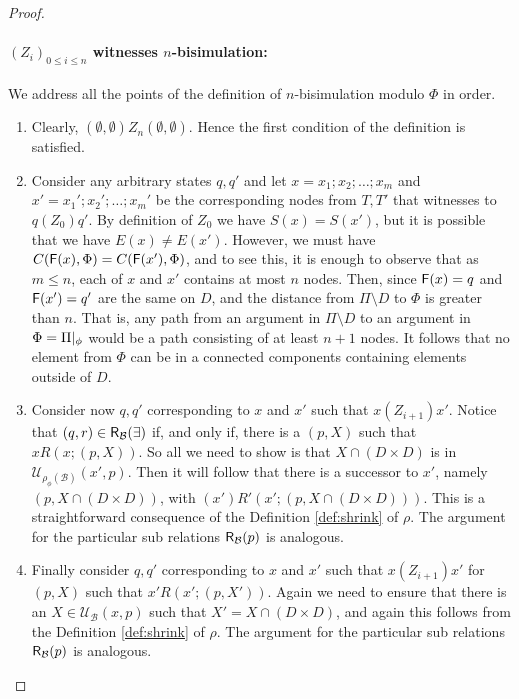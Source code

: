 \documentclass{llncs}
\newcommand{\rels}[1]{{\sf R_{#1}}}
\newcommand{\update}[3]{{\mathcal U}_{#1}(#2,#3)}
\newcommand{\af}{{\sf F}}
\newcommand{\views}{\mathcal B}
\begin{document}
\begin{proof}
\paragraph{$(Z_i)_{0 \leq i \leq n}$ witnesses $n$-bisimulation:} We address all the points of the definition of $n$-bisimulation modulo $\Phi$ in order.
\begin{enumerate}
\item Clearly, $(\emptyset, \emptyset) Z_n (\emptyset, \emptyset)$. Hence the first condition of the definition is satisfied. 
\item Consider any arbitrary states $q,q'$ and let $x = x_1;x_2;\dots;x_m$ and $x' = x_1';x_2';\dots;x_m'$ be the corresponding nodes from $T,T'$ that witnesses to $q(Z_0)q'$. By definition of $Z_0$ we have $S(x) = S(x')$, but it is possible that we have $E(x) \not = E(x')$. However, we must have $C(\af(x), \Phi) = C(\af(x'), \Phi)$, and to see this, it is enough to observe that as $m \leq n$, each of $x$ and $x'$ contains at most $n$ nodes. Then, since $\af(x) = q$ and $\af(x') = q'$ are the same on $D$, and the distance from $\Pi \setminus D$ to $\Phi$ is greater than $n$. That is, any path from an argument in $\Pi \setminus D$ to an argument in $\Phi = {\Pi}|_{\phi}$ would be a path consisting of at least $n+1$ nodes. It follows that no element from $\Phi$ can be in a connected components containing elements outside of $D$.
\item Consider now $q,q'$ corresponding to $x$ and $x'$ such that $x (Z_{i + 1}) x'$. Notice that $(q,r) \in \rels \views(\exists)$ if, and only if, there is a $(p, X)$ such that $x R (x;(p, X))$. So all we need to show is that $X \cap (D \times D)$ is in $\update {\rho_\phi(\views)} {x'} p$. Then it will follow that there is a successor to $x'$, namely $(p, X \cap (D \times D))$, with $(x')R'(x';(p, X \cap (D \times D)))$. This is a straightforward consequence of the Definition \ref{def:shrink} of $\rho$. The argument for the particular sub relations $\rels \views(p)$ is analogous. 
\item Finally consider $q,q'$ corresponding to $x$ and $x'$ such that $x (Z_{i + 1}) x'$ for $(p, X)$ such that $x' R (x';(p, X'))$. Again we need to ensure that there is an $X \in \update \views x p$ such that $X' = X \cap (D \times D)$, and again this follows from the Definition \ref{def:shrink} of $\rho$. The argument for the particular sub relations $\rels \views(p)$ is analogous. 
\end{enumerate}
\end{proof}
\end{document}
